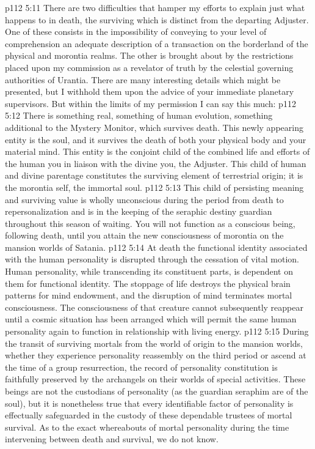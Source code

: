 \pc \vs p112 5:11 There are two difficulties that hamper my efforts to explain just what happens to  in death, the surviving  which is distinct from the departing Adjuster. One of these consists in the impossibility of conveying to your level of comprehension an adequate description of a transaction on the borderland of the physical and morontia realms. The other is brought about by the restrictions placed upon my commission as a revelator of truth by the celestial governing authorities of Urantia. There are many interesting details which might be presented, but I withhold them upon the advice of your immediate planetary supervisors. But within the limits of my permission I can say this much:
\vs p112 5:12 There is something real, something of human evolution, something additional to the Mystery Monitor, which survives death. This newly appearing entity is the soul, and it survives the death of both your physical body and your material mind. This entity is the conjoint child of the combined life and efforts of the human you in liaison with the divine you, the Adjuster. This child of human and divine parentage constitutes the surviving element of terrestrial origin; it is the morontia self, the immortal soul.
\vs p112 5:13 This child of persisting meaning and surviving value is wholly unconscious during the period from death to repersonalization and is in the keeping of the seraphic destiny guardian throughout this season of waiting. You will not function as a conscious being, following death, until you attain the new consciousness of morontia on the mansion worlds of Satania.
\vs p112 5:14 At death the functional identity associated with the human personality is disrupted through the cessation of vital motion. Human personality, while transcending its constituent parts, is dependent on them for functional identity. The stoppage of life destroys the physical brain patterns for mind endowment, and the disruption of mind terminates mortal consciousness. The consciousness of that creature cannot subsequently reappear until a cosmic situation has been arranged which will permit the same human personality again to function in relationship with living energy.
\pc \vs p112 5:15 During the transit of surviving mortals from the world of origin to the mansion worlds, whether they experience personality reassembly on the third period or ascend at the time of a group resurrection, the record of personality constitution is faithfully preserved by the archangels on their worlds of special activities. These beings are not the custodians of personality (as the guardian seraphim are of the soul), but it is nonetheless true that every identifiable factor of personality is effectually safeguarded in the custody of these dependable trustees of mortal survival. As to the exact whereabouts of mortal personality during the time intervening between death and survival, we do not know.
